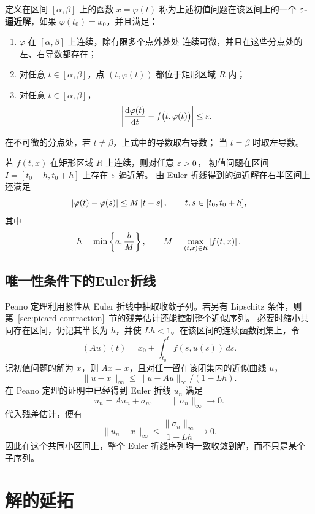 \begin{definition}\label{def:epsilon逼近解}
	定义在区间 $[\alpha,\beta]$ 上的函数 $x=\varphi(t)$
	称为上述初值问题在该区间上的一个 \textbf{$\varepsilon$-逼近解}，如果
	$\varphi(t_0)=x_0$，并且满足：
	\begin{enumerate}
		\item $\varphi$ 在 $[\alpha,\beta]$ 上连续，除有限多个点外处处
			连续可微，并且在这些分点处的左、右导数都存在；
		\item 对任意 $t\in[\alpha,\beta]$，点
			$(t,\varphi(t))$ 都位于矩形区域 $R$ 内；
		\item 对任意 $t\in[\alpha,\beta]$，
			\[
				\left| 
					\dfrac{\mathrm{d}\varphi(t)}{\mathrm{d} t}
					-f\bigl(t,\varphi(t)\bigr)
				 \right|\leq\varepsilon.
			\]
	\end{enumerate}
	在不可微的分点处，若 $t\neq\beta$，上式中的导数取右导数；
	当 $t=\beta$ 时取左导数。
\end{definition}

\begin{proposition}\label{prop:Peano条件下epsilon逼近解的存在性}
	若 $f(t,x)$ 在矩形区域 $R$ 上连续，则对任意 $\varepsilon>0$，
	初值问题在区间 $I=[t_0-h,t_0+h]$ 上存在 $\varepsilon$-逼近解。
	由 Euler 折线得到的逼近解在右半区间上还满足
	\[
		\left| \varphi(t)-\varphi(s) \right|
		\leq M\left| t-s \right|,
		\qquad t,s\in[t_0,t_0+h],
	\]
	其中
	\[
		h=\min\left\{a,\dfrac{b}{M}\right\},
		\qquad
		M=\max_{(t,x)\in R}\left| f(t,x) \right|.
	\]
\end{proposition}

\subsection*{唯一性条件下的Euler折线}
Peano 定理利用紧性从 Euler 折线中抽取收敛子列。若另有 Lipschitz 条件，则第~\ref{sec:picard-contraction}~节的残差估计还能控制整个近似序列。
必要时缩小共同存在区间，仍记其半长为 $h$，并使 $Lh<1$。在该区间的连续函数闭集上，令
\[
 (Au)(t)=x_0+\int_{t_0}^tf(s,u(s))\,ds.
\]
记初值问题的解为 $x$，则 $Ax=x$，且对任一留在该闭集内的近似曲线 $u$，
\[
 \|u-x\|_\infty\leq\|u-Au\|_\infty/(1-Lh).
\]
在 Peano 定理的证明中已经得到 Euler 折线 $u_n$ 满足
\[
 u_n=Au_n+\sigma_n,\qquad\|\sigma_n\|_\infty\longrightarrow0.
\]
代入残差估计，便有
\[
 \|u_n-x\|_\infty\leq\frac{\|\sigma_n\|_\infty}{1-Lh}\longrightarrow0.
\]
因此在这个共同小区间上，整个 Euler 折线序列均一致收敛到解，而不只是某个子序列。

\section{解的延拓}\label{sec:解的延拓}


